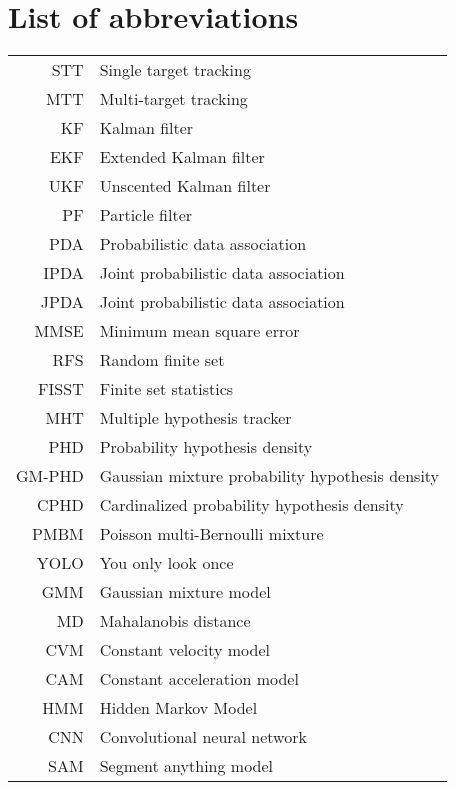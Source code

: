 \documentclass[english,master,unicode,oneside]{ctufit-thesis.c}
\theoremstyle{plain}
\theoremstyle{definition}
\theoremstyle{remark}
\theoremstyle{definition}
\numberwithin{theorem}{chapter}
\begin{document}
\chapter{List of abbreviations}
	
\begin{tabular}{rl}
  STT & Single target tracking \\
MTT & Multi-target tracking \\
KF & Kalman filter \\
EKF & Extended Kalman filter \\
UKF & Unscented Kalman filter \\
PF & Particle filter \\
PDA  & Probabilistic data association \\
IPDA & Joint probabilistic data association\\
JPDA  & Joint probabilistic data association \\
MMSE & Minimum mean square error \\
RFS & Random finite set \\
  FISST & Finite set statistics \\
MHT &   Multiple hypothesis tracker \\
PHD & Probability hypothesis density \\
  GM-PHD & Gaussian mixture probability hypothesis density \\
CPHD & Cardinalized probability hypothesis density \\
PMBM & Poisson multi-Bernoulli mixture \\
YOLO & You only look once \\
GMM & Gaussian mixture model \\
  MD & Mahalanobis distance \\
CVM & Constant velocity model \\
CAM & Constant acceleration model \\
HMM & Hidden Markov Model \\
  CNN & Convolutional neural network \\
  SAM & Segment anything model \\
\end{tabular}

\mainmatter\mainmatterinit %
\end{document}
